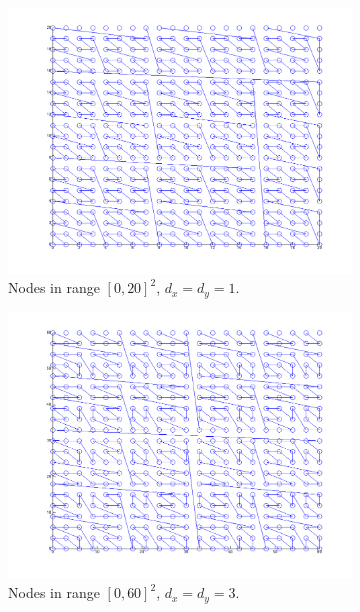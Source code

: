 \documentclass{report}
\begin{document}
\begin{figure}
\begin{subfigure}[t]{0.5\textwidth}
\includegraphics[width=\textwidth]{stencils_content/20x20.png}
\caption{Nodes in range $[0,20]^2$, $d_x = d_y = 1$.}
\label{fig:connor_works}
\end{subfigure}
\begin{subfigure}[t]{0.5\textwidth}
\includegraphics[width=\textwidth]{stencils_content/scale3.png}
\caption{Nodes in range $[0,60]^2$, $d_x = d_y = 3$.}
\label{fig:connor_works2}
\end{subfigure}
\begin{subfigure}[t]{0.5\textwidth}

\end{subfigure}
\end{figure}
\end{document}
